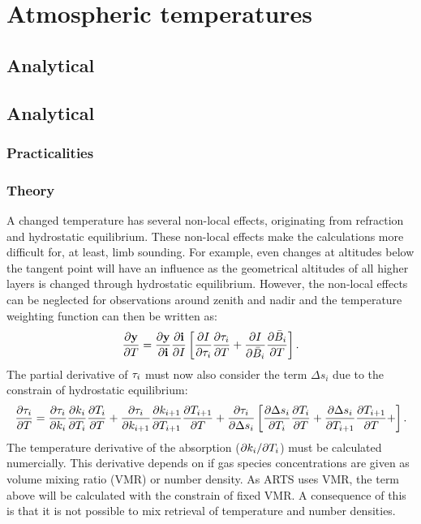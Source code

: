 \section{Atmospheric temperatures}
\label{sec:wfuns:atmtemp}

\subsection{Analytical}
\label{sec:wfuns:atmtemp2}

\subsection{Analytical}
%
\subsubsection{Practicalities}
%





\subsubsection{Theory}
%
A changed temperature has several non-local effects, originating from
refraction and hydrostatic equilibrium. These non-local effects make the
calculations more difficult for, at least, limb sounding. For example, even
changes at altitudes below the tangent point will have an influence as the
geometrical altitudes of all higher layers is changed through hydrostatic
equilibrium. However, the non-local effects can be neglected for observations
around zenith and nadir and the temperature weighting function can
then be written as:
\begin{equation}
  \frac{\partial \mathbf{y}}{\partial T} =  
  \frac{\partial \mathbf{y}}{\partial \mathbf{i}} \frac{\partial \mathbf{i}}{\partial I} 
  \left[
  \frac{\partial I}{\partial \tau_{i}}\frac{\partial \tau_{i}}{\partial T} + 
  \frac{\partial I}{\partial \bar{B}_i}\frac{\partial \bar{B}_i}{\partial T}
  \right].
\end{equation}
The partial derivative of $\tau_{i}$ must now also consider the term $\Delta
s_i$ due to the constrain of hydrostatic equilibrium:
\begin{equation}
  \frac{\partial \tau_{i}}{\partial T} =
  \frac{\partial \tau_{i}}{\partial k_i}\frac{\partial k_i}{\partial T_i} 
  \frac{\partial T_i}{\partial T} +
  \frac{\partial \tau_{i}}{\partial k_{i+1}}\frac{\partial k_{i+1}}{\partial T_{i+1}}
  \frac{\partial T_{i+1}}{\partial T} +
  \frac{\partial \tau_{i}}{\partial \Delta s_i}
  \left[
    \frac{\partial \Delta s_i}{\partial T_i} \frac{\partial T_i}{\partial T} +
    \frac{\partial \Delta s_i}{\partial T_{i+1}} \frac{\partial T_{i+1}}{\partial T} +
  \right].
\end{equation}
The temperature derivative of the absorption ($\partial k_i/\partial T_i$) must be
calculated numercially. This derivative depends on if gas species
concentrations are given as volume mixing ratio (VMR) or number density. As
ARTS uses VMR, the term above will be calculated with the constrain of fixed
VMR. A consequence of this is that it is not possible to mix retrieval of
temperature and number densities.

